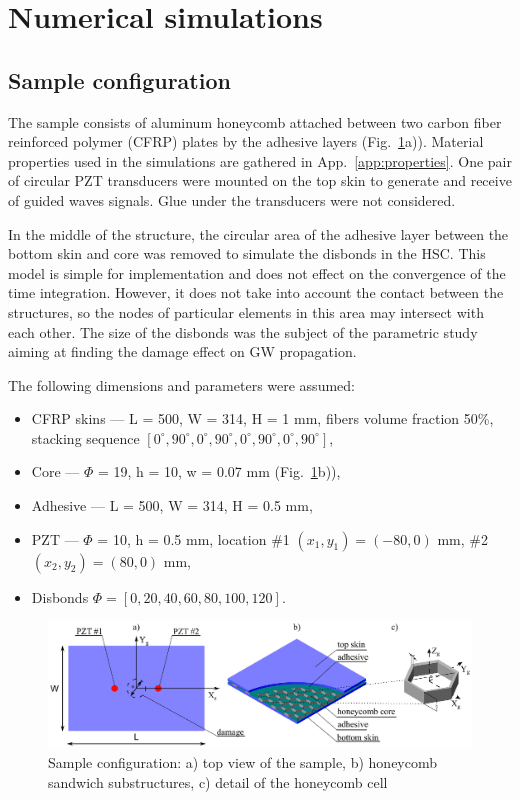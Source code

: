 \documentclass[materials,article,submit,moreauthors,pdftex]{Definitions/mdpi}
\begin{document}
{\section{Numerical simulations}
\label{sec:numerical}
\subsection{Sample configuration}
\label{sec:sample}
The sample consists of aluminum honeycomb attached between two carbon fiber reinforced polymer (CFRP) plates by the adhesive layers (Fig.~\ref{fig:honeycomb}a)).
Material properties used in the simulations are gathered in App.~\ref{app:properties}.
One pair of circular PZT transducers were mounted on the top skin to generate and receive of guided waves signals.
Glue under the transducers were not considered.

In the middle of the structure, the circular area of the adhesive layer between the bottom skin and core was removed to simulate the disbonds in the HSC.
This model is simple for implementation and does not effect on the convergence of the time integration.
However, it does not take into account the contact between the structures, so the nodes of particular elements in this area may intersect with each other.
The size of the disbonds was the subject of the parametric study aiming at finding the damage effect on GW propagation.

The following dimensions and parameters were assumed:
\begin{itemize}
	\item CFRP skins --- L = 500, W = 314, H = 1 mm, fibers volume fraction 
	50\%, stacking sequence 
	\([0^\circ,90^\circ,0^\circ,90^\circ,0^\circ,90^\circ,0^\circ,90^\circ]\),
	\item Core --- \(\Phi\) = 19, h = 10, w = 0.07 mm 
	(Fig.~\ref{fig:honeycomb}b)),
	\item Adhesive --- L = 500, W = 314, H = 0.5 mm,
	\item PZT --- \(\Phi\) = 10, h = 0.5 mm, location \#1 \((x_1,y_1)=(-80,0)\) 
	mm,	\#2 \((x_2,y_2)=(80,0)\) mm,
	\item Disbonds \(\Phi = \left [0, 20, 40, 60, 80, 100, 120 \right ]\).
\end{itemize}

\begin{figure}
	\begin{center}
		\includegraphics[width=1\linewidth]{../../figures/eps/honeycomb.eps}
	\end{center}
	\caption{Sample configuration: a) top view of the sample, b) honeycomb sandwich substructures, c) detail of the honeycomb cell}
	\label{fig:honeycomb}
\end{figure}

}
\end{document}
